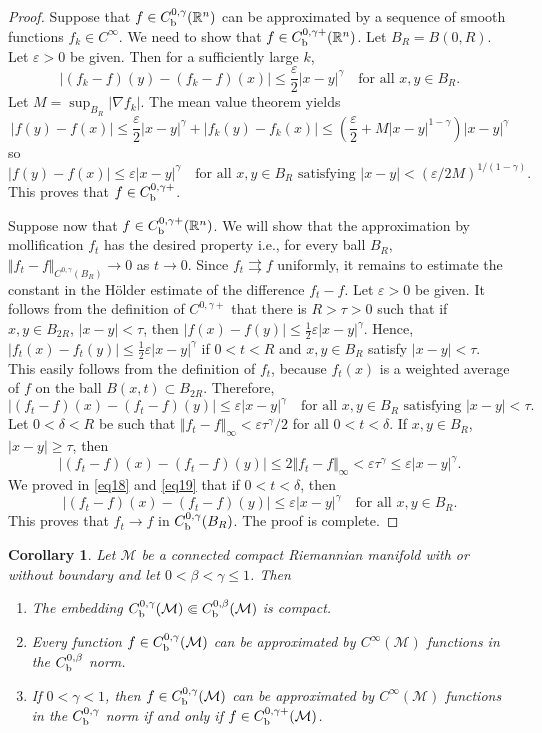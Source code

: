 \documentclass[intlimits,12pt,reqno]{amsart}
\newcommand{\cM}{\mathcal M}
\newcommand{\bbbr}{\mathbb R}
\newcommand{\eps}{\varepsilon}
\numberwithin{equation}{section}
\newtheorem{corollary}[theorem]{Corollary}
\theoremstyle{definition}
\begin{document}
\begin{proof}
Suppose that $f\in C_{\rm b}^{0,\gamma}(\bbbr^n)$ can be approximated by a sequence of smooth functions
$f_k\in C^\infty$. We need to show that $f\in C_{\rm b}^{0,\gamma+}(\bbbr^n)$.
Let $B_R=B(0,R)$. Let $\eps>0$ be given. Then for a sufficiently large $k$,
$$
|(f_k-f)(y)-(f_k-f)(x)|\leq\frac{\eps}{2}|x-y|^\gamma
\quad
\text{for all $x,y\in B_R$.}
$$
Let $M=\sup_{B_R}|\nabla f_k|$. The mean value theorem yields
$$
|f(y)-f(x)|\leq\frac{\eps}{2}|x-y|^\gamma +|f_k(y)-f_k(x)|\leq
\left(\frac{\eps}{2}+M|x-y|^{1-\gamma}\right)|x-y|^\gamma
$$
so
$$
|f(y)-f(x)|\leq\eps |x-y|^\gamma
\quad
\text{for all $x,y\in B_R$ satisfying $|x-y|<(\eps/2M)^{1/(1-\gamma)}$.}
$$
This proves that $f\in C_{\rm b}^{0,\gamma+}$.

Suppose now that
$f\in C_{\rm b}^{0,\gamma+}(\bbbr^n)$. We will show that the approximation by mollification $f_t$ has the desired property i.e., 
for every ball $B_R$, $\Vert f_t-f\Vert_{C^{0,\gamma}(B_R)}\to 0$ as $t\to 0$. 
Since $f_t\rightrightarrows f$ uniformly, it remains to estimate the constant in the H\"older estimate of the difference $f_t-f$.
Let $\eps>0$ be given. It follows from the definition of $C^{0,\gamma+}$
that there is $R>\tau>0$ such that if $x,y\in B_{2R}$, $|x-y|<\tau$, then $|f(x)-f(y)|\leq \frac{1}{2}\eps|x-y|^\gamma$. Hence,  
$|f_t(x)-f_t(y)|\leq\frac{1}{2}\eps|x-y|^\gamma$ 
if $0<t<R$ and
$x,y\in B_R$ satisfy $|x-y|<\tau$. This easily follows from the definition of $f_t$, because $f_t(x)$ 
is a weighted average of $f$ on the ball $B(x,t)\subset B_{2R}$. 
Therefore,
\begin{equation}
\label{eq18}
|(f_t-f)(x)-(f_t-f)(y)|\leq \eps |x-y|^\gamma 
\quad
\text{for all $x,y\in B_R$ satisfying $|x-y|<\tau$.}
\end{equation}
Let $0<\delta<R$ be such that $\Vert f_t-f\Vert_\infty<\eps\tau^\gamma/2$ for all $0<t<\delta$. 
If $x,y\in B_R$, $|x-y|\geq\tau$, then 
\begin{equation}
\label{eq19}
|(f_t-f)(x)-(f_t-f)(y)|\leq 2\Vert f_t-f\Vert_\infty<\eps\tau^\gamma\leq\eps |x-y|^\gamma.
\end{equation}
We proved in \eqref{eq18} and \eqref{eq19} that if $0<t<\delta$, then
$$
|(f_t-f)(x)-(f_t-f)(y)|\leq \eps |x-y|^\gamma 
\quad
\text{for all $x,y\in B_R$.}
$$
This proves that $f_t\to f$ in $C_{\rm b}^{0,\gamma}(B_R)$. The proof is complete.
\end{proof}
\begin{corollary}
\label{T4.5}
Let $\cM$ be a connected compact Riemannian manifold with or without boundary and let $0<\beta<\gamma\leq 1$. Then
\begin{enumerate}
\item The embedding $C_{\rm b}^{0,\gamma}(\cM)\Subset C_{\rm b}^{0,\beta}(\cM)$ is compact.
\item Every function $f\in C_{\rm b}^{0,\gamma}(\cM)$ can be approximated by $C^\infty(\cM)$ functions in the $C_{\rm b}^{0,\beta}$ norm.
\item If $0<\gamma<1$, then $f\in C_{\rm b}^{0,\gamma}(\cM)$ can be approximated by $C^{\infty}(\cM)$ functions in the $C_{\rm b}^{0,\gamma}$ norm
if and only if $f\in C_{\rm b}^{0,\gamma+}(\cM)$.
\end{enumerate}
\end{corollary}
\end{document}
